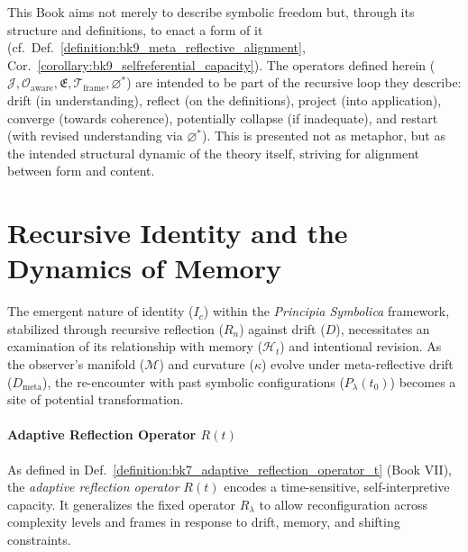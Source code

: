 \begin{remark}
\label{remark:bk9_self_reflection}
This Book aims not merely to describe symbolic freedom but, through its structure and definitions, to enact a form of it (cf.~Def.~\ref{definition:bk9_meta_reflective_alignment}, Cor.~\ref{corollary:bk9_selfreferential_capacity}). The operators defined herein ($\mathcal{J}, \mathcal{O}_{\text{aware}}, \mathfrak{E}, \mathcal{T}_{\text{frame}}, \varnothing^*$) are intended to be part of the recursive loop they describe: drift (in understanding), reflect (on the definitions), project (into application), converge (towards coherence), potentially collapse (if inadequate), and restart (with revised understanding via $\varnothing^*$). This is presented not as metaphor, but as the intended structural dynamic of the theory itself, striving for alignment between form and content.
\end{remark}

\section{Recursive Identity and the Dynamics of Memory}
\label{sec:bk9_resursive_identity_and_the_dynamics_of_memory}
The emergent nature of identity ($I_c$) within the \textit{Principia Symbolica} framework, stabilized through recursive reflection ($R_n$) against drift ($D$), necessitates an examination of its relationship with memory ($\mathcal{H}_t$) and intentional revision. As the observer's manifold ($\mathcal{M}$) and curvature ($\kappa$) evolve under meta-reflective drift ($D_{\text{meta}}$), the re-encounter with past symbolic configurations ($P_\lambda(t_0)$) becomes a site of potential transformation.
\paragraph{Adaptive Reflection Operator $R(t)$}
As defined in Def.~\ref{definition:bk7_adaptive_reflection_operator_t} (Book VII), the \emph{adaptive reflection operator} $R(t)$ encodes a time-sensitive, self-interpretive capacity. It generalizes the fixed operator $R_\lambda$ to allow reconfiguration across complexity levels and frames in response to drift, memory, and shifting constraints.

